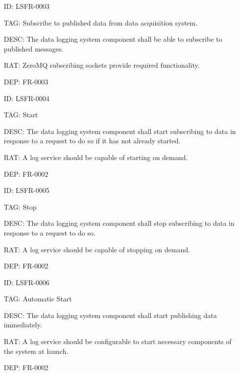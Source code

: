         \begin{itemize}
          \setlength{\itemindent}{.5in}
          \itemsep .15em
          \item[ID:] LSFR-0003
          \item[TAG:] Subscribe to published data from data acquisition system.
          \item[DESC:] The data logging system component shall be able to
            subscribe to published messages.
          \item[RAT:] ZeroMQ subscribing sockets provide required functionality.
          \item[DEP:] FR-0003
        \end{itemize}

        \begin{itemize}
          \setlength{\itemindent}{.5in}
          \itemsep .15em
          \item[ID:] LSFR-0004
          \item[TAG:] Start
          \item[DESC:] The data logging system component shall start
            subscribing to data in response to a request to do so if it has not
            already started.
          \item[RAT:] A log service should be capable of starting on demand.
          \item[DEP:] FR-0002
        \end{itemize}

        \begin{itemize}
          \setlength{\itemindent}{.5in}
          \itemsep .15em
          \item[ID:] LSFR-0005
          \item[TAG:] Stop
          \item[DESC:] The data logging system component shall stop
            subscribing to data in response to a request to do so.
          \item[RAT:] A log service should be capable of stopping on demand.
          \item[DEP:] FR-0002
        \end{itemize}

        \begin{itemize}
          \setlength{\itemindent}{.5in}
          \itemsep .15em
          \item[ID:] LSFR-0006
          \item[TAG:] Automatic Start
          \item[DESC:] The data logging system component shall start
            publishing data immediately.
          \item[RAT:] A log service should be configurable to start necessary
            components of the system at launch.
          \item[DEP:] FR-0002
        \end{itemize}

